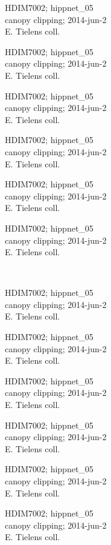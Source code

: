 \documentclass[2pt]{extarticle}
\begin{document}
\noindent
\parbox{0.16\textwidth}{\tiny \raggedright \rule[-0.3\baselineskip]{0pt}{10pt}HDIM7002; hippnet\_05\\ canopy clipping; 2014-jun-2\\ E. Tielens coll.}
\parbox{0.16\textwidth}{\tiny \raggedright \rule[-0.3\baselineskip]{0pt}{10pt}HDIM7002; hippnet\_05\\ canopy clipping; 2014-jun-2\\ E. Tielens coll.}
\parbox{0.16\textwidth}{\tiny \raggedright \rule[-0.3\baselineskip]{0pt}{10pt}HDIM7002; hippnet\_05\\ canopy clipping; 2014-jun-2\\ E. Tielens coll.}
\parbox{0.16\textwidth}{\tiny \raggedright \rule[-0.3\baselineskip]{0pt}{10pt}HDIM7002; hippnet\_05\\ canopy clipping; 2014-jun-2\\ E. Tielens coll.}
\parbox{0.16\textwidth}{\tiny \raggedright \rule[-0.3\baselineskip]{0pt}{10pt}HDIM7002; hippnet\_05\\ canopy clipping; 2014-jun-2\\ E. Tielens coll.}
\parbox{0.16\textwidth}{\tiny \raggedright \rule[-0.3\baselineskip]{0pt}{10pt}HDIM7002; hippnet\_05\\ canopy clipping; 2014-jun-2\\ E. Tielens coll.} \\ 
\vspace{0.001in} 

\noindent
\parbox{0.16\textwidth}{\tiny \raggedright \rule[-0.3\baselineskip]{0pt}{10pt}HDIM7002; hippnet\_05\\ canopy clipping; 2014-jun-2\\ E. Tielens coll.}
\parbox{0.16\textwidth}{\tiny \raggedright \rule[-0.3\baselineskip]{0pt}{10pt}HDIM7002; hippnet\_05\\ canopy clipping; 2014-jun-2\\ E. Tielens coll.}
\parbox{0.16\textwidth}{\tiny \raggedright \rule[-0.3\baselineskip]{0pt}{10pt}HDIM7002; hippnet\_05\\ canopy clipping; 2014-jun-2\\ E. Tielens coll.}
\parbox{0.16\textwidth}{\tiny \raggedright \rule[-0.3\baselineskip]{0pt}{10pt}HDIM7002; hippnet\_05\\ canopy clipping; 2014-jun-2\\ E. Tielens coll.}
\parbox{0.16\textwidth}{\tiny \raggedright \rule[-0.3\baselineskip]{0pt}{10pt}HDIM7002; hippnet\_05\\ canopy clipping; 2014-jun-2\\ E. Tielens coll.}
\parbox{0.16\textwidth}{\tiny \raggedright \rule[-0.3\baselineskip]{0pt}{10pt}HDIM7002; hippnet\_05\\ canopy clipping; 2014-jun-2\\ E. Tielens coll.} \\ 
\vspace{0.001in} 
\end{document}
